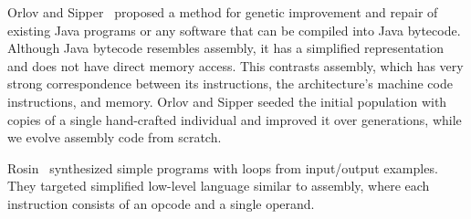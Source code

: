 \documentclass[dvipsnames, format=sigconf]{acmart}
\begin{document}
Orlov and Sipper~\cite{orlov2011flight} proposed a method for genetic improvement and repair of existing Java programs or any software that can be compiled into Java bytecode. Although Java bytecode resembles assembly, it has a simplified representation and does not have direct memory access. This contrasts assembly, which has very strong correspondence between its instructions, the architecture's machine code instructions, and memory. %
Orlov and Sipper seeded the initial population with copies of a single hand-crafted individual and improved it over generations, while we evolve assembly code from scratch.

Rosin~\cite{Rosin2019Stepping} synthesized simple programs with loops from input/output examples. They targeted simplified low-level language similar to assembly, where each instruction consists of an opcode and a single operand. %

\end{document}
